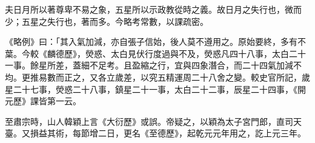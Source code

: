 \begin{pinyinscope}
 夫日月所以著尊卑不易之象，五星所以示政教從時之義。故日月之失行也，微而少；五星之失行也，著而多。今略考常數，以課疏密。



 《略例》曰：「其入氣加減，亦自張子信始，後人莫不遵用之。原始要終，多有不葉。今較《麟德歷》，熒惑、太白見伏行度過與不及，熒惑凡四十八事，太白二十一事。餘星所差，蓋細不足考。且盈縮之行，宜與四象潛合，而二十四氣加減不均。更推易數而正之，又各立歲差，以究五精運周二十八舍之變。較史官所記，歲星二十七事，熒惑二十八事，鎮星二十一事，太白二十二事，辰星二十四事，《開元歷》課皆第一云。



 至肅宗時，山人韓穎上言《大衍歷》或誤。帝疑之，以穎為太子宮門郎，直司天臺。又損益其術，每節增二日，更名《至德歷》，起乾元元年用之，訖上元三年。



\end{pinyinscope}
